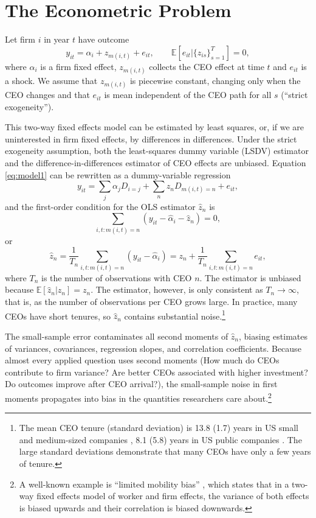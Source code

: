 \documentclass[11pt,a4paper]{article}
\begin{document}
\section{The Econometric Problem}

Let firm $i$ in year $t$ have outcome
\begin{equation}\label{eq:model1}
  y_{it} = \alpha_i + z_{m(i,t)} + e_{it},\qquad \mathbb E[e_{it}|\{z_{is}\}_{s=1}^T]=0,
\end{equation}
where $\alpha_i$ is a firm fixed effect, $z_{m(i,t)}$ collects the CEO effect at time $t$ and $e_{it}$ is a shock. We assume that $z_{m(i,t)}$ is piecewise constant, changing only when the CEO changes and that $e_{it}$ is mean independent of the CEO path for all $s$ (``strict exogeneity'').

This two-way fixed effects model can be estimated by least squares, or, if we are uninterested in firm fixed effects, by differences in differences. Under the strict exogeneity assumption, both the least-squares dummy variable (LSDV) estimator and the difference-in-differences estimator of CEO effects are unbiased. Equation \eqref{eq:model1} can be rewritten as a dummy-variable regression 
$$
y_{it} = \sum_{j}\alpha_j D_{i=j} + \sum_{n} z_n D_{m(i,t)=n}  + e_{it},
$$
and the first-order condition for the OLS estimator $\hat z_n$ is
$$
\sum_{i,t:m(i,t)=n} (y_{it} - \hat\alpha_i - \hat z_n) =0,
$$
or 
$$
\hat z_n = \frac{1}{T_n} \sum_{i,t:m(i,t)=n} (y_{it} - \hat\alpha_i) = z_n + \frac{1}{T_n} \sum_{i,t:m(i,t)=n} e_{it},
$$
where $T_n$ is the number of observations with CEO $n$. The estimator is unbiased because $\mathbb E[\hat z_n|z_n] = z_n$. The estimator, however, is only consistent as $T_n\to\infty$, that is, as the number of observations per CEO grows large. In practice, many CEOs have short tenures, so $\hat z_n$ contains substantial noise.\footnote{The mean CEO tenure (standard deviation) is 13.8 (1.7) years in US small and medium-sized companies \citep{simsek2007ceo}, 8.1 (5.8) years in US public companies \citep{brookman2009ceo}. The large standard deviations demonstrate that many CEOs have only a few years of tenure.} 

The small-sample error contaminates all second moments of $\hat z_n$, biasing estimates of variances, covariances, regression slopes, and correlation coefficients. Because almost every applied question uses second moments (How much do CEOs contribute to firm variance? Are better CEOs associated with higher investment? Do outcomes improve after CEO arrival?), the small-sample noise in first moments propagates into bias in the quantities researchers care about.\footnote{A well-known example is ``limited mobility bias'' \citep{andrews2008high}, which states that in a two-way fixed effects model of worker and firm effects, the variance of both effects is biased upwards and their correlation is biased downwards.}
\end{document}
